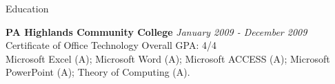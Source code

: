 \documentclass{resume} %
\begin{document}
\begin{rSection}{Education}





{\bf PA Highlands Community College} \hfill {\em January 2009 - December 2009} 
\\ Certificate of Office Technology \hfill { Overall GPA: 4/4}
\smallskip \\
Microsoft Excel (A); Microsoft Word (A); Microsoft ACCESS (A); Microsoft PowerPoint (A); Theory of Computing (A).


\end{rSection}
\end{document}
